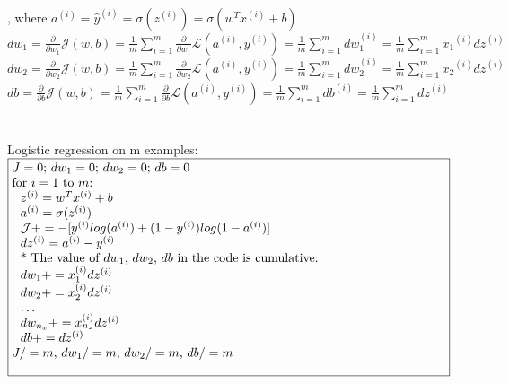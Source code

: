 \documentclass{article}
\begin{document}
, where $a^{(i)} = \hat{y}^{(i)} = \sigma(z^{(i)}) = \sigma{(w^T x^{(i)} + b)}$\\

$dw_1 = \frac{\partial}{\partial w_1} \mathcal{J}(w,b) =\frac{1}{m}\sum_{i=1}^{m} \frac{\partial}{\partial w_1}\mathcal{L}(a^{(i)},y^{(i)})= \frac{1}{m}\sum_{i=1}^{m} dw_1^{(i)} = \frac{1}{m}\sum_{i=1}^m {x_1}^{(i)}dz^{(i)}$\\

$dw_2 = \frac{\partial}{\partial w_2} \mathcal{J}(w,b) =\frac{1}{m}\sum_{i=1}^{m} \frac{\partial}{\partial w_2}\mathcal{L}(a^{(i)},y^{(i)})= \frac{1}{m}\sum_{i=1}^{m} dw_2^{(i)} = \frac{1}{m}\sum_{i=1}^m {x_2}^{(i)}dz^{(i)}$ \\

$db = \frac{\partial}{\partial b} \mathcal{J}(w,b) =\frac{1}{m}\sum_{i=1}^{m} \frac{\partial}{\partial b}\mathcal{L}(a^{(i)},y^{(i)})= \frac{1}{m}\sum_{i=1}^{m} db^{(i)}= \frac{1}{m}\sum_{i=1}^{m} dz^{(i)}$ \\\\\\


Logistic regression on m examples:\\

$\noindent\fbox{%
\parbox{\textwidth}{%
$J=0$; $dw_1 = 0$; $dw_2 = 0$; $db=0$\\

for $i=1$ to $m$:\\
$\indent$ $\indent$ $z^{(i)} = w^T x^{(i)} + b$\\
$\indent$ $\indent$ $a^{(i)} = \sigma(z^{(i)})$\\
$\indent$ $\indent$ $\mathcal{J} += -[y^{(i)} log(a^{(i)}) + (1-y^{(i)})log(1-a^{(i)})]$\\
$\indent$ $\indent$ $dz^{(i)} = a^{(i)}- y^{(i)}$\\

$\indent$ $\indent$ * The value of $dw_1$, $dw_2$, $db$ in the code is cumulative:\\
$\indent$ $\indent$ $dw_1 += x_1^{(i)}dz^{(i)}$\\
$\indent$ $\indent$ $dw_2 += x_2^{(i)}dz^{(i)}$\\
$\indent$ $\indent$ $\dots$\\
$\indent$ $\indent$ $dw_{n_x} += x_{n_x}^{(i)}dz^{(i)}$\\

$\indent$ $\indent$ $db += dz^{(i)}$\\

$J/=m$,  $dw_1 /=m$,  $dw_2 /=m$,  $db /=m$\\
}%
}$\\
\end{document}
